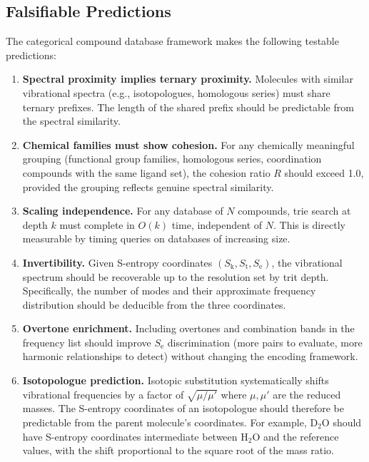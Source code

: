 \documentclass[11pt,a4paper]{article}
\theoremstyle{definition}
\theoremstyle{remark}
\newcommand{\Sk}{S_{\mathrm{k}}}
\newcommand{\St}{S_{\mathrm{t}}}
\newcommand{\Se}{S_{\mathrm{e}}}
\begin{document}
\subsection{Falsifiable Predictions}

The categorical compound database framework makes the following testable predictions:

\begin{enumerate}
\item \textbf{Spectral proximity implies ternary proximity.} Molecules with similar vibrational spectra (e.g., isotopologues, homologous series) must share ternary prefixes. The length of the shared prefix should be predictable from the spectral similarity.

\item \textbf{Chemical families must show cohesion.} For any chemically meaningful grouping (functional group families, homologous series, coordination compounds with the same ligand set), the cohesion ratio $R$ should exceed 1.0, provided the grouping reflects genuine spectral similarity.

\item \textbf{Scaling independence.} For any database of $N$ compounds, trie search at depth $k$ must complete in $O(k)$ time, independent of $N$. This is directly measurable by timing queries on databases of increasing size.

\item \textbf{Invertibility.} Given S-entropy coordinates $(\Sk, \St, \Se)$, the vibrational spectrum should be recoverable up to the resolution set by trit depth. Specifically, the number of modes and their approximate frequency distribution should be deducible from the three coordinates.

\item \textbf{Overtone enrichment.} Including overtones and combination bands in the frequency list should improve $\Se$ discrimination (more pairs to evaluate, more harmonic relationships to detect) without changing the encoding framework.

\item \textbf{Isotopologue prediction.} Isotopic substitution systematically shifts vibrational frequencies by a factor of $\sqrt{\mu/\mu'}$ where $\mu, \mu'$ are the reduced masses. The S-entropy coordinates of an isotopologue should therefore be predictable from the parent molecule's coordinates. For example, D$_2$O should have S-entropy coordinates intermediate between H$_2$O and the reference values, with the shift proportional to the square root of the mass ratio.
\end{enumerate}
\end{document}
